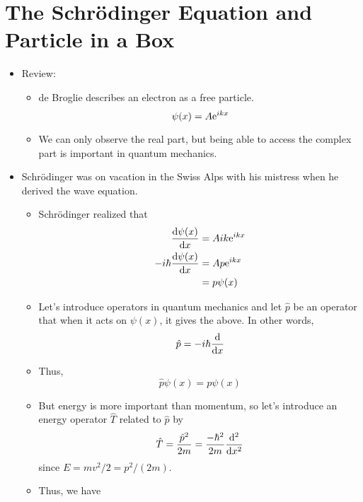 \documentclass[../notes.tex]{subfiles}
\begin{document}
\section{The Schr\"{o}dinger Equation and Particle in a Box}
\begin{itemize}
    \item {}Review:
    \begin{itemize}
        \item de Broglie describes an electron as a free particle.
        \begin{equation*}
            \psi(x) = A\e[ikx]
        \end{equation*}
        \item We can only observe the real part, but being able to access the complex part is important in quantum mechanics.
    \end{itemize}
    \item Schr\"{o}dinger was on vacation in the Swiss Alps with his mistress when he derived the wave equation.
    \begin{itemize}
        \item Schr\"{o}dinger realized that
        \begin{align*}
            \dv{\psi(x)}{x} &= Aik\e[ikx]\\
            -i\hbar\dv{\psi(x)}{x} &= Ap\e[ikx]\\
            &= p\psi(x)
        \end{align*}
        \item Let's introduce operators in quantum mechanics and let $\hat{p}$ be an operator that when it acts on $\psi(x)$, it gives the above. In other words,
        \begin{equation*}
            \hat{p} = -i\hbar\dv{x}
        \end{equation*}
        \item Thus,
        \begin{equation*}
            \hat{p}\psi(x) = p\psi(x)
        \end{equation*}
        \item But energy is more important than momentum, so let's introduce an energy operator $\hat{T}$ related to $\hat{p}$ by
        \begin{equation*}
            \hat{T} = \frac{\hat{p}^2}{2m}
            = \frac{-\hbar^2}{2m}\dv[2]{x}
        \end{equation*}
        since $E=mv^2/2=p^2/(2m)$.
        \item Thus, we have

\end{itemize}
\end{itemize}
\end{document}
